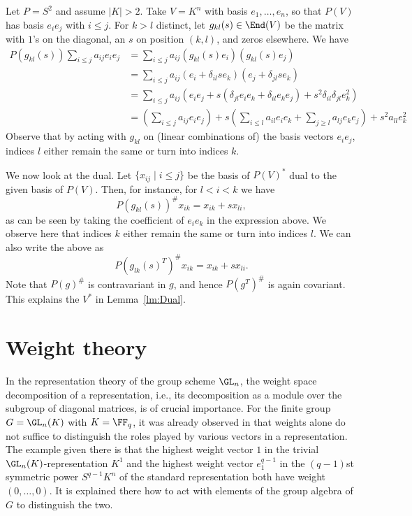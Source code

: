 \documentclass{amsart}
\begin{document}
\begin{ex} \label{ex:Contravariant}
Let $P=S^2$ and assume $|K|>2$. Take $V=K^n$ with basis $e_1,\ldots,e_n$,
so that $P(V)$ has basis $e_i e_j$ with $i \leq j$. For $k>l$ distinct,
let $g_{kl}(s) \in \End(V)$ be the matrix with $1$'s on the diagonal,
an $s$ on position $(k,l)$, and zeros elsewhere. We have
\begin{align*} 
P(g_{kl}(s)) \sum_{i \leq j} a_{ij} e_i e_j &= \sum_{i \leq
j} a_{ij}(g_{kl}(s) e_i)(g_{kl}(s) e_j)\\ 
&= \sum_{i \leq j} a_{ij} (e_i + \delta_{il} s e_k)(e_j + \delta_{jl} s e_k) \\
&= \sum_{i \leq j} a_{ij} (e_i e_j + s(\delta_{jl}
e_i e_k + \delta_{il} e_k e_j) + s^2 \delta_{il} \delta_{jl} e_k^2)\\
&= \left(\sum_{i \leq j} a_{ij} e_i e_j \right)
+ s \left(
\sum_{i \leq l} a_{il} e_i e_k 
+ 
\sum_{j \geq l} a_{lj} e_k e_j 
\right)
+ s^2 a_{ll} e_k^2
\end{align*}
Observe that by acting with $g_{kl}$ on (linear
combinations of) the basis vectors $e_i e_j$, indices $l$ 
either remain the same or turn into indices $k$.

We now look at the dual. Let $\{x_{ij} \mid i \leq j\}$ be the basis of
$P(V)^*$ dual to the given basis of $P(V)$. Then, for instance, for $l
< i < k$ we have
\[ P(g_{kl}(s))^\# x_{ik}=x_{ik} + s x_{li}, \]
as can be seen by taking the coefficient of $e_i e_k$ in the expression
above. We observe here that indices $k$ either remain the same
or turn into indices $l$. We can also write the above as
\[ P(g_{lk}(s)^T)^\# x_{ik}=x_{ik} + s x_{li}. \]
Note that $P(g)^\#$ is contravariant in $g$, and hence $P(g^T)^\#$
is again covariant. This explains the $V^*$ in Lemma~\ref{lm:Dual}.
\end{ex}

\section{Weight theory} \label{sec:Weights}

In the representation theory of the group scheme $\GL_n$, the weight
space decomposition of a representation, i.e., its decomposition as a
module over the subgroup of diagonal matrices, is of crucial importance.
For the finite group $G=\GL_n(K)$ with $K=\FF_q$, it was already
observed in \cite[Page 129, Remark]{Steinberg16} that weights alone
do not suffice to distinguish the roles played by various vectors in
a representation. The example given there is that the highest weight
vector $1$ in the trivial $\GL_n(K)$-representation $K^1$ and the highest
weight vector $e_1^{q-1}$ in the $(q-1)$st symmetric power $S^{q-1}K^n$
of the standard representation both have weight $(0,\ldots,0)$.  It is
explained there how to act with elements of the group algebra of $G$
to distinguish the two.
\end{document}
